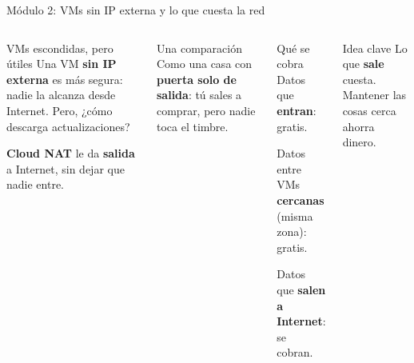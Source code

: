 \documentclass[aspectratio=169,10pt,c]{beamer}
\begin{document}
\begin{frame}{Módulo 2: VMs sin IP externa y lo que cuesta la red}
\begin{columns}[T,onlytextwidth]
\begin{block}{VMs escondidas, pero útiles}
\small Una VM \textbf{sin IP externa} es más segura: nadie la alcanza desde Internet. Pero, ¿cómo descarga actualizaciones?\par\smallskip
\textbf{Cloud NAT} le da \textbf{salida} a Internet, sin dejar que nadie entre.
\end{block}
\begin{exampleblock}{Una comparación}
\small Como una casa con \textbf{puerta solo de salida}: tú sales a comprar, pero nadie toca el timbre.
\end{exampleblock}
\begin{alertblock}{Qué se cobra}
\small
Datos que \textbf{entran}: gratis.\par\smallskip
Datos entre VMs \textbf{cercanas} (misma zona): gratis.\par\smallskip
Datos que \textbf{salen a Internet}: se cobran.
\end{alertblock}
\begin{block}{Idea clave}
\small Lo que \textbf{sale} cuesta. Mantener las cosas cerca ahorra dinero.
\end{block}
\end{columns}
\end{frame}
\end{document}
